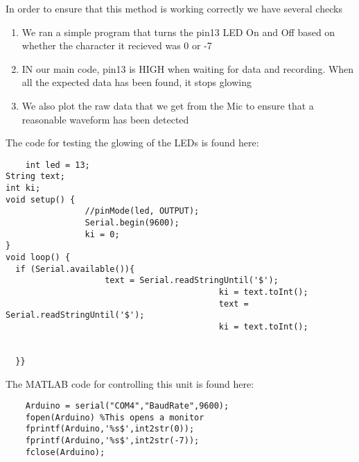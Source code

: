 In order to ensure that this method is working correctly we have several checks 
\begin{enumerate}
    \item We ran a simple program that turns the pin13 LED On and Off based on whether the character it recieved was 0 or -7
    \item IN our main code, pin13 is HIGH when waiting for data and recording. When all the expected data has been found, it stops glowing 
    \item We also plot the raw data that we get from the Mic to ensure that a reasonable waveform has been detected
\end{enumerate}
The code for testing the glowing of the LEDs is found here: 
\begin{lstlisting}
    int led = 13;
String text;
int ki;
void setup() {
                //pinMode(led, OUTPUT);
                Serial.begin(9600);
                ki = 0;
}
void loop() { 
  if (Serial.available()){
                    text = Serial.readStringUntil('$');
                                           ki = text.toInt(); 
                                           text = Serial.readStringUntil('$');
                                           ki = text.toInt();
                                                   
                                              
  }}

\end{lstlisting}
The MATLAB code for controlling this unit is found here: 
\begin{lstlisting}
    Arduino = serial("COM4","BaudRate",9600);
    fopen(Arduino) %This opens a monitor
    fprintf(Arduino,'%s$',int2str(0));
    fprintf(Arduino,'%s$',int2str(-7));
    fclose(Arduino);

\end{lstlisting}

